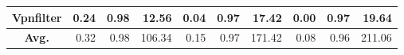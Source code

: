 \begin{table*}[]
{\begin{tabular}{c|r|r|r|r|r|r|r|r|r}
Vpnfilter            & 0.24                                               & 0.98                                                 & 12.56                                              & 0.04                                               & 0.97                                                 & 17.42                                              & 0.00                                               & 0.97                                                 & 19.64                                             \\ \hline
\textbf{Avg.}                  & 0.32                                               & 0.98                                                 & 106.34                                             & 0.15                                               & 0.97                                                 & 171.42                                             & 0.08                                               & 0.96                                                 & 211.06                                            \\ \hline
\end{tabular}
}
\end{table*}